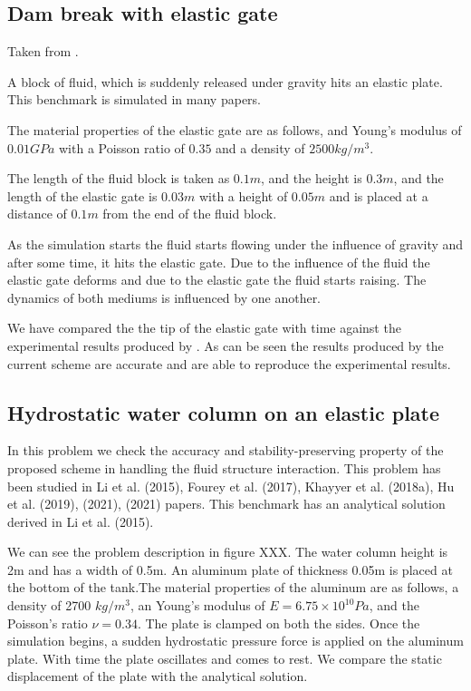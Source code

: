 \documentclass[preprint,12pt]{elsarticle}
\begin{document}
\subsection{Dam break with elastic gate}
\label{sec:dam-break-elastic-gate}

Taken from \citet{sun2019fully}.

A block of fluid, which is suddenly released under gravity hits an elastic
plate. This benchmark is simulated in many papers.

The material properties of the elastic gate are as follows, and Young's
modulus of $0.01 GPa$ with a Poisson ratio of $0.35$ and a density of
$2500 kg/m^3$.

The length of the fluid block is taken as $0.1m$, and the height is $0.3m$,
and the length of the elastic gate is $0.03m$ with a height of $0.05m$ and is
placed at a distance of $0.1m$ from the end of the fluid block.


As the simulation starts the fluid starts flowing under the influence of
gravity and after some time, it hits the elastic gate. Due to the influence of
the fluid the elastic gate deforms and due to the elastic gate the fluid
starts raising. The dynamics of both mediums is influenced by one another.


We have compared the the tip of the elastic gate with time against the
experimental results produced by \cite{xxx}. As can be seen the results
produced by the current scheme are accurate and are able to reproduce the
experimental results.



\subsection{Hydrostatic water column on an elastic plate}
\label{sec:hydrostatic-water-column-on-an-elastic-plate}

In this problem we check the accuracy and stability-preserving property of the
proposed scheme in handling the fluid structure interaction. This problem has
been studied in Li et al. (2015), Fourey et al. (2017), Khayyer et
al. (2018a), Hu et al. (2019), (2021), (2021) papers. This benchmark has an
analytical solution derived in Li et al. (2015).

We can see the problem description in figure XXX. The water column height is
2m and has a width of 0.5m. An aluminum plate of thickness 0.05m is placed at
the bottom of the tank.The material properties of the aluminum are as follows,
a density of 2700 $kg/m^3$, an Young’s modulus of $E = 6.75 \times 10^{10} Pa$,
and the Poisson’s ratio $\nu = 0.34$. The plate is clamped on both the
sides. Once the simulation begins, a sudden hydrostatic pressure force is
applied on the aluminum plate. With time the plate oscillates and comes to
rest. We compare the static displacement of the plate with the analytical
solution.
\end{document}
